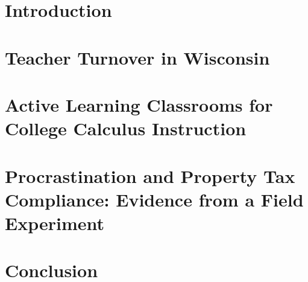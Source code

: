 \documentclass[12pt]{report}
\numberwithin{equation}{section}
\newcommand{\doublespaced}{\renewcommand{\baselinestretch}{2}\normalfont}
\newcommand{\singlespaced}{\renewcommand{\baselinestretch}{1}\normalfont}
\newcommand{\draftspaced}{\doublespaced}
\begin{document}
    
    \newpage

    
    \newpage

    
    \newpage

    
    \newpage

    
    \newpage

    \singlespaced
    \tableofcontents
    \newpage

    \listoftables
    \newpage

    \listoffigures
    \newpage

    \draftspaced

    \chapter{Introduction}
    
    
    \newpage

    \chapter{Teacher Turnover in Wisconsin}
    
    \newpage

    \chapter{Active Learning Classrooms for College Calculus Instruction}
    
    \newpage

    \chapter{Procrastination and Property Tax Compliance: Evidence from a Field Experiment}
    
    \newpage

    \chapter{Conclusion}
    
    \newpage

    
    \newpage

    
    
\end{document}
